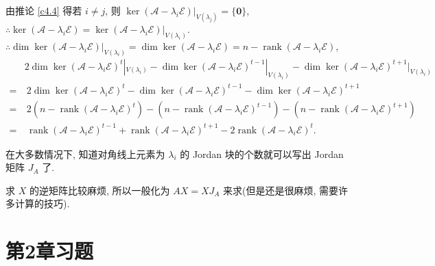 \documentclass{ctexart}
\begin{document}
由推论 \ref{c4.4} 得若 $i\neq j$, 则 $\ker(\mathcal{A}-\lambda_i\mathcal{E})|_{V(\lambda_j)}=\{\boldsymbol{0}\}$, $\therefore\ker(\mathcal{A}-\lambda_i\mathcal{E})=\ker(\mathcal{A}-\lambda_i\mathcal{E})|_{V(\lambda_i)}$. $\therefore\dim\ker(\mathcal{A}-\lambda_i\mathcal{E})|_{V(\lambda_i)}=\dim\ker(\mathcal{A}-\lambda_i\mathcal{E})=n-\operatorname{rank}(\mathcal{A}-\lambda_i\mathcal{E})$,
\begin{align*}
    & 2\dim\ker(\mathcal{A}-\lambda_i\mathcal{E})^t|_{V(\lambda_i)}-\dim\ker(\mathcal{A}-\lambda_i\mathcal{E})^{t-1}|_{V(\lambda_i)}-\dim\ker(\mathcal{A}-\lambda_i\mathcal{E})^{t+1}|_{V(\lambda_i)} \\
    = &\ 2\dim\ker(\mathcal{A}-\lambda_i\mathcal{E})^t-\dim\ker(\mathcal{A}-\lambda_i\mathcal{E})^{t-1}-\dim\ker(\mathcal{A}-\lambda_i\mathcal{E})^{t+1} \\
    = &\ 2(n-\operatorname{rank}(\mathcal{A}-\lambda_i\mathcal{E})^t)-(n-\operatorname{rank}(\mathcal{A}-\lambda_i\mathcal{E})^{t-1})-(n-\operatorname{rank}(\mathcal{A}-\lambda_i\mathcal{E})^{t+1}) \\
    = &\ \operatorname{rank}(\mathcal{A}-\lambda_i\mathcal{E})^{t-1}+\operatorname{rank}(\mathcal{A}-\lambda_i\mathcal{E})^{t+1}-2\operatorname{rank}(\mathcal{A}-\lambda_i\mathcal{E})^t.
\end{align*}

在大多数情况下, 知道对角线上元素为 $\lambda_i$ 的 Jordan 块的个数就可以写出 Jordan 矩阵 $J_A$ 了.

求 $X$ 的逆矩阵比较麻烦, 所以一般化为 $AX=XJ_A$ 来求(但是还是很麻烦, 需要许多计算的技巧).
\section{第2章习题}
\end{document}
